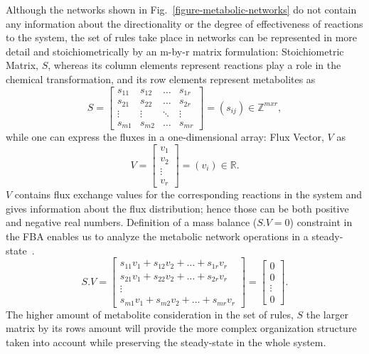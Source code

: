 Although the networks shown in Fig.~\ref{figure-metabolic-networks} do not contain any information about the directionality or the degree of effectiveness of reactions to the system, the set of rules take place in networks can be represented in more detail and stoichiometrically by an m-by-r matrix formulation: Stoichiometric Matrix, $S$, whereas its column elements represent reactions play a role in the chemical transformation, and its row elements represent metabolites as
\begin{equation} \tag{1}
	S =  \begin{bmatrix} 
		s_{11} & s_{12} & \dots  & s_{1r}\\
		s_{21} & s_{22} & \dots  & s_{2r}\\
		\vdots & \vdots &\ddots & \vdots \\
		s_{m1} & s_{m2} & \dots & s_{mr} 
	\end{bmatrix}=(s_{ij})\in \mathbb{Z}^{mxr},
	\label{stoichio}
\end{equation}
while one can express the fluxes in a one-dimensional array: Flux Vector, $V$ as 
\begin{equation} \tag{2}
	V = \begin{bmatrix} 
		v_{1} \\
		v_{2} \\
		\vdots \\
		v_{r}
	\end{bmatrix}=(v_{i})\in \mathbb{R}.
	\label{solutionvector}
\end{equation}
$V$ contains flux exchange values for the corresponding reactions in the system and gives information about the flux distribution; hence those can be both positive and negative real numbers. Definition of a mass balance ($S.V=0$) constraint in the FBA enables us to analyze the metabolic network operations in a steady-state~\cite{KAUFFMAN2003491,PRICE2004}.
\begin{equation} \tag{3}
	S.V = \begin{bmatrix} 
		s_{11}v_{1} + s_{12}v_{2} + \dots + s_{1r}v_{r} \\
		s_{21}v_{1} + s_{22}v_{2} + \dots + s_{2r}v_{r} \\
		\vdots \\
		s_{m1}v_{1} + s_{m2}v_{2} + \dots + s_{mr}v_{r} 
	\end{bmatrix}=
	\begin{bmatrix} 
		0 \\
		0 \\
		\vdots \\
		0
	\end{bmatrix}.
	\label{massbalanceconstraint}
\end{equation}
The higher amount of metabolite consideration in the set of rules, $S$ \textemdash the larger matrix by its rows amount will provide the more complex organization structure taken into account while preserving the steady-state in the whole system.

